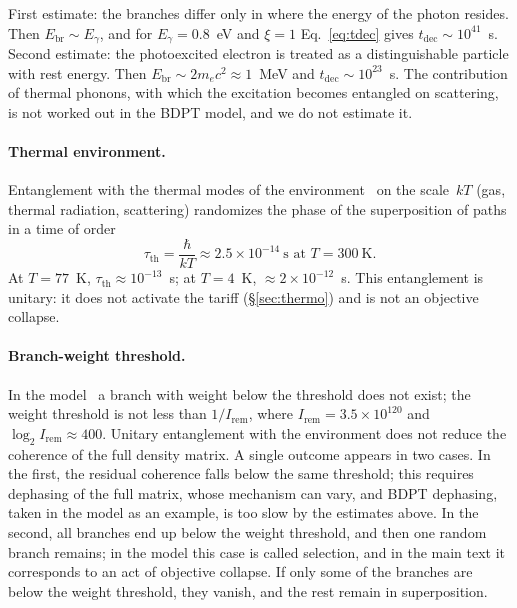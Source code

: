 \documentclass[11pt,a4paper]{article}
\newcommand{\Sref}[1]{\hyperref[#1]{\S\ref{#1}}}
\begin{document}
First estimate: the branches differ only in where the energy of the photon resides. Then $E_{\mathrm{br}}\sim E_\gamma$, and for $E_\gamma=0.8$~eV and $\xi=1$ Eq.~\eqref{eq:tdec} gives $t_{\mathrm{dec}}\sim10^{41}$~s. Second estimate: the photoexcited electron is treated as a distinguishable particle with rest energy. Then $E_{\mathrm{br}}\sim 2m_ec^2\approx1$~MeV and $t_{\mathrm{dec}}\sim10^{23}$~s. The contribution of thermal phonons, with which the excitation becomes entangled on scattering, is not worked out in the BDPT model, and we do not estimate it.

\paragraph{Thermal environment.}
Entanglement with the thermal modes of the environment~\cite{ponfilenok2026branch,hornberger2004tli} on the scale~$kT$ (gas, thermal radiation, scattering) randomizes the phase of the superposition of paths in a time of order
\begin{equation}
\tau_{\mathrm{th}}=\frac{\hbar}{kT}\approx 2.5\times10^{-14}~\text{s at }T=300~\text{K}.
\label{eq:tdec_env}
\end{equation}
At $T=77$~K, $\tau_{\mathrm{th}}\approx10^{-13}$~s; at $T=4$~K, $\approx2\times10^{-12}$~s. This entanglement is unitary: it does not activate the tariff (\Sref{sec:thermo}) and is not an objective collapse.

\paragraph{Branch-weight threshold.}
In the model~\cite{ponfilenok2026threshold} a branch with weight below the threshold does not exist; the weight threshold is not less than $1/I_{\mathrm{rem}}$, where $I_{\mathrm{rem}}=3.5\times10^{120}$ and $\log_2 I_{\mathrm{rem}}\approx400$. Unitary entanglement with the environment does not reduce the coherence of the full density matrix. A single outcome appears in two cases. In the first, the residual coherence falls below the same threshold; this requires dephasing of the full matrix, whose mechanism can vary, and BDPT dephasing, taken in the model as an example, is too slow by the estimates above. In the second, all branches end up below the weight threshold, and then one random branch remains; in the model this case is called selection, and in the main text it corresponds to an act of objective collapse. If only some of the branches are below the weight threshold, they vanish, and the rest remain in superposition.
\end{document}
